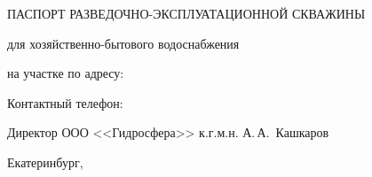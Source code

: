 \FPeval{}	%
\FPeval{}	%
\FPeval{}	%
\FPeval{}		%

\newcommand{\txtPumpResults}{
57,0 & 		%
\num{\DepthWT} & 		%
32,0 & 		%
\num{\DepthAT}  &		%
\num{\LevelDyn} & 	%
\num{5.0}  &		%
\num{\txtDebit} & %
\num{\DebitRel}  &		%
\num{4.0}  &		%
ПКС			%
}			%



\setlength{\extrarowheight}{1mm} %


\begin{titlepage}
	\begin{center}
		\textbf{\txtExecutor}
		\vspace{5.5cm}
		
		{\LARGE ПАСПОРТ РАЗВЕДОЧНО-ЭКСПЛУАТАЦИОННОЙ СКВАЖИНЫ}
		\vspace{0.25cm}
		
		для хозяйственно-бытового водоснабжения
		
		\bigskip
		
		на участке по адресу:

		\bigskip				
		\underline{\txtAddress}
		
		\bigskip
		\bigskip

		Контактный телефон: \txtPhoneNumber
		
		\vfill
	
		\bigskip
		
	\end{center}

	\vfill
	
	\newlength{\ML}
	\hfill
	\begin{minipage}{1.0\textwidth}
		Директор ООО <<Гидросфера>> к.г.м.н.
		\underline{\hspace{\ML}} А.\,А.~Кашкаров\\
	\end{minipage}%
	
	\bigskip
	
	\vfill
	\begin{center}
		Екатеринбург, \txtYear
	\end{center}			

	\end{titlepage}

